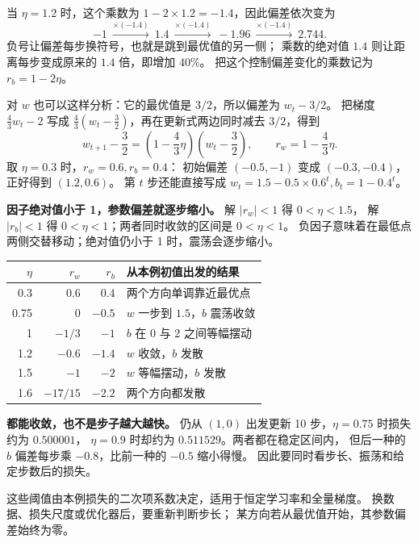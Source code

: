 当 $\eta=1.2$ 时，这个乘数为 $1-2\times1.2=-1.4$，因此偏差依次变为
\[
-1\ \xrightarrow{\times(-1.4)}\ 1.4
\ \xrightarrow{\times(-1.4)}\ -1.96
\ \xrightarrow{\times(-1.4)}\ 2.744.
\]
负号让偏差每步换符号，也就是跳到最优值的另一侧；
乘数的绝对值 $1.4$ 则让距离每步变成原来的 $1.4$ 倍，即增加 $40\%$。
把这个控制偏差变化的乘数记为 $r_b=1-2\eta$。

对 $w$ 也可以这样分析：它的最优值是 $3/2$，所以偏差为 $w_t-3/2$。
把梯度 $\frac43w_t-2$ 写成 $\frac43(w_t-\frac32)$，再在更新式两边同时减去 $3/2$，得到
\[
w_{t+1}-\frac32=\left(1-\frac43\eta\right)\left(w_t-\frac32\right),
\qquad r_w=1-\frac43\eta.
\]
取 $\eta=0.3$ 时，$r_w=0.6,r_b=0.4$：
初始偏差 $(-0.5,-1)$ 变成 $(-0.3,-0.4)$，正好得到 $(1.2,0.6)$。
第 $t$ 步还能直接写成 $w_t=1.5-0.5\times0.6^t,b_t=1-0.4^t$。

\textbf{因子绝对值小于 1，参数偏差就逐步缩小。}
解 $|r_w|<1$ 得 $0<\eta<1.5$，
解 $|r_b|<1$ 得 $0<\eta<1$；两者同时收敛的区间是 $\boxed{0<\eta<1}$。
负因子意味着在最低点两侧交替移动；绝对值仍小于 1 时，震荡会逐步缩小。
\begin{center}\small
{}
\begin{tabularx}{\linewidth}{@{}rrrX@{}}
\toprule
$\eta$ & $r_w$ & $r_b$ & 从本例初值出发的结果\\\midrule
0.3 & 0.6 & 0.4 & 两个方向单调靠近最优点\\
0.75 & 0 & $-0.5$ & $w$ 一步到 $1.5$，$b$ 震荡收敛\\
1 & $-1/3$ & $-1$ & $b$ 在 0 与 2 之间等幅摆动\\
1.2 & $-0.6$ & $-1.4$ & $w$ 收敛，$b$ 发散\\
1.5 & $-1$ & $-2$ & $w$ 等幅摆动，$b$ 发散\\
1.6 & $-17/15$ & $-2.2$ & 两个方向都发散\\
\bottomrule
\end{tabularx}
\end{center}
\textbf{都能收敛，也不是步子越大越快。}
仍从 $(1,0)$ 出发更新 10 步，$\eta=0.75$ 时损失约为 $0.500001$，
$\eta=0.9$ 时却约为 $0.511529$。两者都在稳定区间内，
但后一种的 $b$ 偏差每步乘 $-0.8$，比前一种的 $-0.5$ 缩小得慢。
因此要同时看步长、振荡和给定步数后的损失。

\begin{boundarybox}
这些阈值由本例损失的二次项系数决定，适用于恒定学习率和全量梯度。
换数据、损失尺度或优化器后，要重新判断步长；
某方向若从最优值开始，其参数偏差始终为零。
\end{boundarybox}

